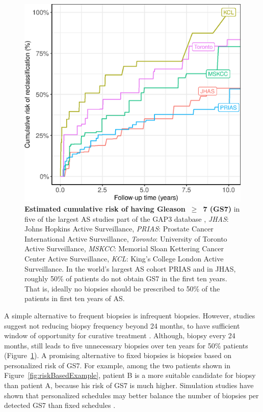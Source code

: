 \begin{figure}[!htb]
\centerline{\includegraphics[width=\columnwidth]{images/npmle_plot.eps}}
\caption{\textbf{Estimated cumulative risk of having Gleason~$\geq$~7 (GS7)} in five of the largest AS studies part of the GAP3 database \citep{gap3_2018}, \textit{JHAS}: Johns Hopkins Active Surveillance, \textit{PRIAS}: Prostate Cancer International Active Surveillance, \textit{Toronto}: University of Toronto Active Surveillance, \textit{MSKCC}: Memorial Sloan Kettering Cancer Center Active Surveillance, \textit{KCL}: King's College London Active Surveillance. In the world's largest AS cohort PRIAS and in JHAS, roughly 50\% of patients do not obtain GS7 in the first ten years. That is, ideally no biopsies should be prescribed to 50\% of the patients in first ten years of AS.}
\label{fig:npmle_plot}
\end{figure}

A simple alternative to frequent biopsies is infrequent biopsies. However, studies suggest not reducing biopsy frequency beyond 24 months, to have sufficient window of opportunity for curative treatment \citep{inoue2018comparative,de2017estimating}. Although, biopsy every 24 months, still leads to five unnecessary biopsies over ten years for 50\% patients (Figure~\ref{fig:npmle_plot}). A promising alternative to fixed biopsies is biopsies based on personalized risk of GS7. For example, among the two patients shown in Figure~\ref{fig:riskBasedExample}, patient B is a more suitable candidate for biopsy than patient A, because his risk of GS7 is much higher. Simulation studies have shown that personalized schedules may better balance the number of biopsies per detected GS7 than fixed schedules \citep{tomer2019}. 

